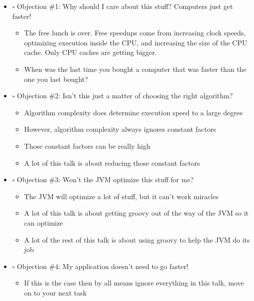 \documentclass[11pt]{article}
\begin{document}
\begin{itemize}
\item $\square$ Objection \#1: Why should I care about this stuff? Computers just get faster!

\begin{itemize}
\item The free lunch is over. Free speedups come from increasing clock speeds, optimizing execution inside the CPU, and increasing the size of the CPU cache. Only CPU caches are getting bigger.

\item When was the last time you bought a computer that was faster than the one you last bought?
\end{itemize}

\item $\square$ Objection \#2: Isn't this just a matter of choosing the right algorithm?

\begin{itemize}
\item Algorithm complexity does determine execution speed to a large degree

\item However, algorithm complexity always ignores constant factors

\item Those constant factors can be really high

\item A lot of this talk is about reducing those constant factors
\end{itemize}

\item $\square$ Objection \#3: Won't the JVM optimize this stuff for me?

\begin{itemize}
\item The JVM will optimize a lot of stuff, but it can't work miracles

\item A lot of this talk is about getting groovy out of the way of the JVM so it can optimize

\item A lot of the rest of this talk is about using groovy to help the JVM do its job
\end{itemize}

\item $\square$ Objection \#4: My application doesn't need to go faster!

\begin{itemize}
\item If this is the case then by all means ignore everything in this talk, move on to your next task


\end{itemize}
\end{itemize}
\end{document}
